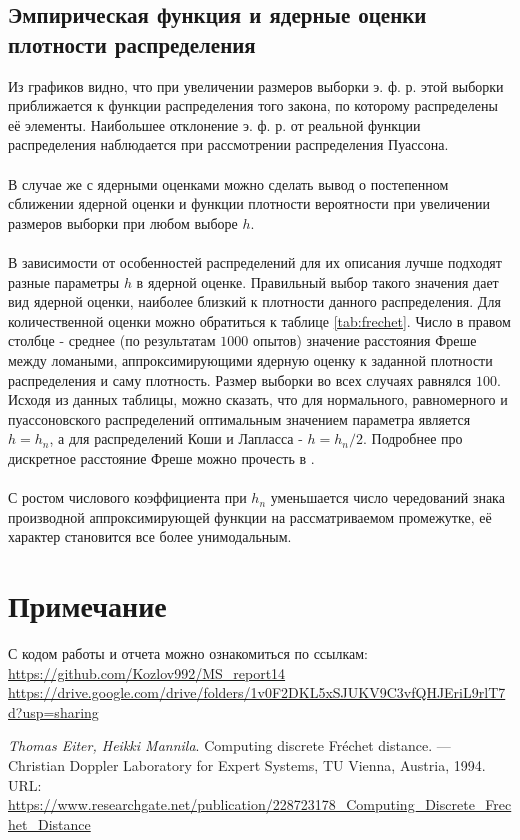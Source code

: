 \documentclass[a4paper]{article}
\begin{document}
\subsection{Эмпирическая функция и ядерные оценки плотности распределения}
Из графиков видно, что при увеличении размеров выборки э. ф. р. этой выборки приближается к функции распределения того закона, по которому распределены её элементы. Наибольшее отклонение э. ф. р. от реальной функции распределения наблюдается при рассмотрении распределения Пуассона.\\\\
В случае же с ядерными оценками можно сделать вывод о постепенном сближении ядерной оценки и функции плотности вероятности при увеличении размеров выборки при любом выборе $h$.\\\\
В зависимости от особенностей распределений для их описания лучше подходят разные параметры $h$ в ядерной оценке. Правильный выбор такого значения дает вид ядерной оценки, наиболее близкий к плотности данного распределения. Для количественной оценки можно обратиться к таблице \ref{tab:frechet}. Число в правом столбце - среднее (по результатам $1000$ опытов) значение расстояния Фреше между ломаными, аппроксимирующими ядерную оценку к заданной плотности распределения и саму плотность. Размер выборки во всех случаях равнялся $100$. Исходя из данных таблицы, можно сказать, что для нормального, равномерного и пуассоновского распределений оптимальным значением параметра является $h=h_n$, а для распределений Коши и Лапласса - $h=h_n/2$. Подробнее про дискретное расстояние Фреше можно прочесть в \cite{book1}.\\\\
С ростом числового коэффициента при $h_n$ уменьшается число чередований знака производной аппроксимирующей функции на рассматриваемом промежутке, её характер становится все более унимодальным.
\section*{Примечание}
С кодом работы и отчета можно ознакомиться по ссылкам:\\\url{https://github.com/Kozlov992/MS_report14}\\
\url{https://drive.google.com/drive/folders/1v0F2DKL5xSJUKV9C3vfQHJEriL9rlT7d?usp=sharing}
\begin{thebibliography}{9}
\textit{Thomas Eiter, Heikki Mannila}. Computing discrete Fréchet distance. — Christian Doppler Laboratory for Expert Systems, TU Vienna, Austria, 1994.  URL: \url{https://www.researchgate.net/publication/228723178_Computing_Discrete_Frechet_Distance}
\end{thebibliography}
\end{document}

